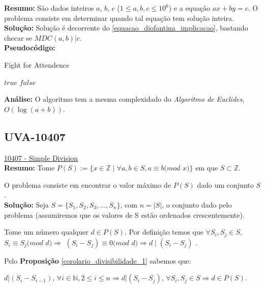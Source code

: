 \textbf{Resumo:}
São dados inteiros $a$, $b$, $c$ ($1 \leq a, b, c \leq 10^6$) e a equação $ax+by=c$. O problema consiste em determinar 
quando tal equação tem solução inteira.
\\

\textbf{Solução:}
Solução é decorrente do \autoref{equacao_diofantina_implicacao}, bastando checar se $MDC(a,b)|c$.
\\

\textbf{Pseudocódigo:}
\begin{algorithm}
\caption{Fight for Attendence}
\begin{algorithmic}[1]
\State \Return $true$
\EndIf
\State \Return $false$
\EndProcedure
\end{algorithmic}
\end{algorithm}

\textbf{Análise:}
O algoritmo tem a mesma complexidado do \textit{Algoritmo de Euclides}, $O(\log{(a+b)})$. 



\subsection{UVA-10407}
\href{https://uva.onlinejudge.org/index.php?option=onlinejudge&page=show_problem&problem=1348}{10407 - Simple Division} \\

\textbf{Resumo:} 
Tome $P(S) := \{ x \in \mathbb{Z} \mid  \forall a , b \in S , a \equiv b ( mod$ $x)\}$ em que $S \subset \mathbb{Z}$.

O problema consiste em encontrar o valor máximo de $P(S)$ dado um conjunto $S$.
\\

\textbf{Solução:} 
Seja $S = \{S_1, S_2, S_3, ..., S_n\}$, com $n = |S|$, o conjunto dado pelo problema (assumiremos que os valores de S estão ordenados crescentemente).

Tome um número qualquer $d \in P(S)$. Por definição temos que $\forall S_i, S_j \in S$, $S_i \equiv S_j ( mod$ $d) \Rightarrow $ 
$ (S_i-S_j) \equiv 0 ( mod$ $d) \Rightarrow d \mid (S_i-S_j)$ .

Pelo \textbf{Proposição} \autoref{corolario_divisibilidade_1} sabemos que:

$d | (S_i-S_{i-1})$, $ \forall i \in \mathbb{N}, 2 \leq i \leq n \Rightarrow d | (S_i-S_j)$, $ \forall S_i, S_j \in S \Rightarrow d \in P(S)$.

